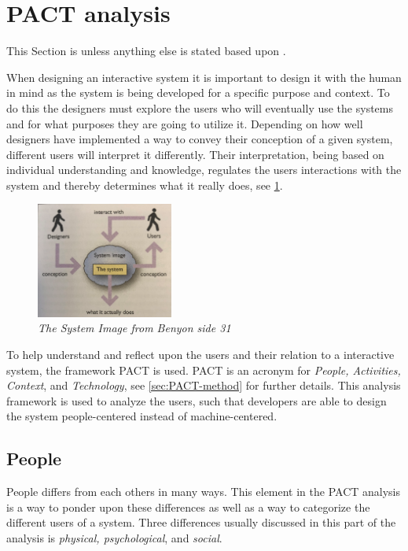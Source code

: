 \section{PACT analysis}\label{sec:PACT}
This Section is unless anything else is stated based upon \cite{Benyon}.

When designing an interactive system it is important to design it with the human in mind as the system is being developed for a specific purpose and context.
To do this the designers must explore the users who will eventually use the systems and for what purposes they are going to utilize it. 
Depending on how well designers have implemented a way to convey their conception of a given system, different users will interpret it differently. 
Their interpretation, being based on individual understanding and knowledge, regulates the users interactions with the system and thereby determines what it really does, see \cref{fig:PACT-SystemImage}.

\begin{figure}[H]
	\centering
	\includegraphics[width=0.4\textwidth]{billeder/SystemImage-Benyon.png}
	\caption{\textit{The System Image from {\color{red}Benyon side 31}}}
	\label{fig:PACT-SystemImage}
\end{figure}

To help understand and reflect upon the users and their relation to a interactive system, the framework PACT is used. 
PACT is an acronym for \textit{People, Activities, Context}, and \textit{Technology}, see \cref{sec:PACT-method} for further details.
This analysis framework is used to analyze the users, such that developers are able to design the system people-centered instead of machine-centered.

\subsection{People}
People differs from each others in many ways.
This element in the PACT analysis is a way to ponder upon these differences as well as a way to categorize the different users of a system. 
Three differences usually discussed in this part of the analysis is \textit{physical, psychological}, and \textit{social}.

